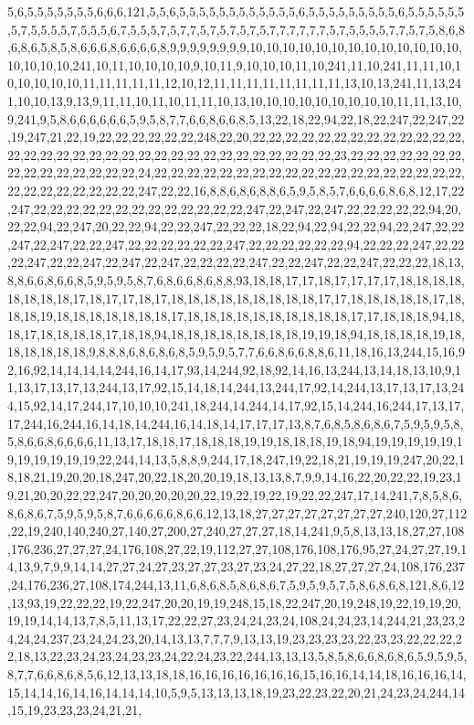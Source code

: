 5,6,5,5,5,5,5,5,5,6,6,6,121,5,5,6,5,5,5,5,5,5,5,5,5,5,5,5,6,5,5,5,5,5,5,5,5,5,6,5,5,5,5,5,5,5,7,5,5,5,5,7,5,5,5,6,7,5,5,5,7,5,7,7,5,7,5,7,5,7,5,7,7,7,7,7,7,5,7,5,5,5,5,7,7,5,7,5,8,6,8,6,8,6,5,8,5,8,6,6,6,8,6,6,6,6,8,9,9,9,9,9,9,9,9,10,10,10,10,10,10,10,10,10,10,10,10,10,10,10,10,10,241,10,11,10,10,10,10,9,10,11,9,10,10,10,11,10,241,11,10,241,11,11,10,10,10,10,10,10,11,11,11,11,11,12,10,12,11,11,11,11,11,11,11,11,13,10,13,241,11,13,241,10,10,13,9,13,9,11,11,10,11,10,11,11,10,13,10,10,10,10,10,10,10,10,10,11,11,13,10,9,241,9,5,8,6,6,6,6,6,6,5,9,5,8,7,7,6,6,8,6,6,8,5,13,22,18,22,94,22,18,22,247,22,247,22,19,247,21,22,19,22,22,22,22,22,22,248,22,20,22,22,22,22,22,22,22,22,22,22,22,22,22,22,22,22,22,22,22,22,22,22,22,22,22,22,22,22,22,22,22,22,22,23,22,22,22,22,22,22,22,22,22,22,22,22,22,22,22,24,22,22,22,22,22,22,22,22,22,22,22,22,22,22,22,22,22,22,22,22,22,22,22,22,22,22,22,247,22,22,16,8,8,6,8,6,8,8,6,5,9,5,8,5,7,6,6,6,6,8,6,8,12,17,22,247,22,22,22,22,22,22,22,22,22,22,22,22,22,247,22,247,22,247,22,22,22,22,22,94,20,22,22,94,22,247,20,22,22,94,22,22,247,22,22,22,18,22,94,22,94,22,22,94,22,247,22,22,247,22,247,22,22,247,22,22,22,22,22,22,247,22,22,22,22,22,22,94,22,22,22,247,22,22,22,247,22,22,247,22,247,22,247,22,22,22,22,247,22,22,247,22,22,247,22,22,22,18,13,8,8,6,6,8,6,6,8,5,9,5,9,5,8,7,6,8,6,6,8,6,8,8,93,18,18,17,17,18,17,17,17,17,18,18,18,18,18,18,18,18,17,18,17,17,18,17,18,18,18,18,18,18,18,18,18,17,17,18,18,18,18,18,17,18,18,18,19,18,18,18,18,18,18,18,17,18,18,18,18,18,18,18,18,18,18,17,17,18,18,18,94,18,18,17,18,18,18,18,17,18,18,94,18,18,18,18,18,18,18,18,19,19,18,94,18,18,18,18,19,18,18,18,18,18,18,9,8,8,8,6,8,6,8,6,8,5,9,5,9,5,7,7,6,6,8,6,6,8,8,6,11,18,16,13,244,15,16,92,16,92,14,14,14,14,244,16,14,17,93,14,244,92,18,92,14,16,13,244,13,14,18,13,10,9,11,13,17,13,17,13,244,13,17,92,15,14,18,14,244,13,244,17,92,14,244,13,17,13,17,13,244,15,92,14,17,244,17,10,10,10,241,18,244,14,244,14,17,92,15,14,244,16,244,17,13,17,17,244,16,244,16,14,18,14,244,16,14,18,14,17,17,17,13,8,7,6,8,5,8,6,8,6,7,5,9,5,9,5,8,5,8,6,6,8,6,6,6,6,11,13,17,18,18,17,18,18,18,19,19,18,18,18,19,18,94,19,19,19,19,19,19,19,19,19,19,19,22,244,14,13,5,8,8,9,244,17,18,247,19,22,18,21,19,19,19,247,20,22,18,18,21,19,20,20,18,247,20,22,18,20,20,19,18,13,13,8,7,9,9,14,16,22,20,22,22,19,23,19,21,20,20,22,22,247,20,20,20,20,20,22,19,22,19,22,19,22,22,247,17,14,241,7,8,5,8,6,8,6,8,6,7,5,9,5,9,5,8,7,6,6,6,6,6,8,6,6,12,13,18,27,27,27,27,27,27,27,27,240,120,27,112,22,19,240,140,240,27,140,27,200,27,240,27,27,27,18,14,241,9,5,8,13,13,18,27,27,108,176,236,27,27,27,24,176,108,27,22,19,112,27,27,108,176,108,176,95,27,24,27,27,19,14,13,9,7,9,9,14,14,27,27,24,27,23,27,27,23,27,23,24,27,22,18,27,27,27,24,108,176,237,24,176,236,27,108,174,244,13,11,6,8,6,8,5,8,6,8,6,7,5,9,5,9,5,7,5,8,6,8,6,8,121,8,6,12,13,93,19,22,22,22,19,22,247,20,20,19,19,248,15,18,22,247,20,19,248,19,22,19,19,20,19,19,14,14,13,7,8,5,11,13,17,22,22,27,23,24,24,23,24,108,24,24,23,14,244,21,23,23,24,24,24,237,23,24,24,23,20,14,13,13,7,7,7,9,13,13,19,23,23,23,23,22,23,23,22,22,22,22,18,13,22,23,24,23,24,23,23,24,22,24,23,22,244,13,13,13,5,8,5,8,6,6,8,6,8,6,5,9,5,9,5,8,7,7,6,6,8,6,8,5,6,12,13,13,18,18,16,16,16,16,16,16,16,15,16,16,14,14,18,16,16,16,14,15,14,14,16,14,16,14,14,14,10,5,9,5,13,13,13,18,19,23,22,23,22,20,21,24,23,24,244,14,15,19,23,23,23,24,21,21,